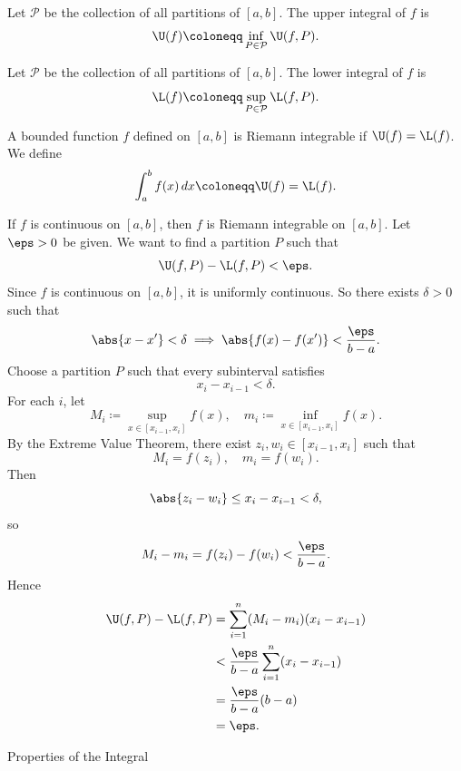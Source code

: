 \begin{definition}
    Let $\mathcal{P}$ be the collection of all partitions of $[a,b]$.
    The upper integral of $f$ is
    \[
        \U(f)\coloneqq\inf_{P\in\mathcal{P}}\U(f,P).
    \]
\end{definition}

\begin{definition}
    Let $\mathcal{P}$ be the collection of all partitions of $[a,b]$.
    The lower integral of $f$ is
    \[
        \L(f)\coloneqq\sup_{P\in\mathcal{P}}\L(f,P).
    \]
\end{definition}

\begin{definition}
    A bounded function $f$ defined on $[a,b]$ is Riemann integrable if $\U(f)=\L(f)$.
    We define
    \[
        \int_a^b f(x)\,dx \coloneqq \U(f) = \L(f).
    \]
\end{definition}

\begin{theorem}{
    If $f$ is continuous on $[a,b]$, then $f$ is Riemann integrable on $[a,b]$.
}
	Let $\eps > 0$ be given.
    We want to find a partition $P$ such that
    \[
        \U(f,P) - \L(f,P) < \eps.
    \]
    Since $f$ is continuous on $[a,b]$, it is uniformly continuous.
    So there exists $\delta > 0$ such that
    \[
        \abs{x-x^\prime} < \delta \implies \abs{f(x) - f(x^\prime)} < \frac{\eps}{b-a}.
    \]
    Choose a partition $P$ such that every subinterval satisfies
    \[
        x_i - x_{i-1} < \delta.
    \]
    For each $i$, let
    \[
        M_i \coloneqq \sup_{x\in[x_{i-1},x_i]} f(x), \quad m_i \coloneqq \inf_{x\in[x_{i-1},x_i]} f(x).
    \]
    By the Extreme Value Theorem, there exist $z_i,w_i\in[x_{i-1},x_i]$ such that
    \[
        M_i = f(z_i), \quad m_i = f(w_i).
    \]
    Then
    \[
        \abs{z_i-w_i} \leq x_i-x_{i-1} < \delta,
    \]
    so
    \[
        M_i - m_i = f(z_i)-f(w_i) < \frac{\eps}{b-a}.
    \]
    Hence
    \begin{align*}
        \U(f,P) - \L(f,P)
        &= \sum_{i=1}^n (M_i - m_i)(x_i - x_{i-1})\\
        &< \frac{\eps}{b-a}\sum_{i=1}^n (x_i - x_{i-1})\\
        &= \frac{\eps}{b-a}(b-a)\\
        &= \eps.
    \end{align*}
\end{theorem}

\begin{section*}{Properties of the Integral}
\end{section*}

